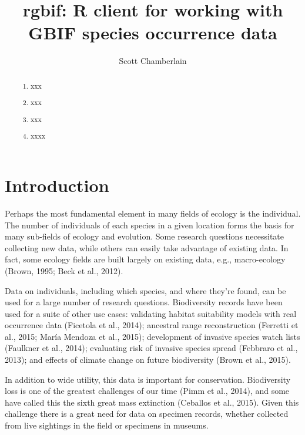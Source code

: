 \documentclass[author-year, review, 11pt]{components/elsarticle} %
\begin{document}
\begin{frontmatter}

  \title{rgbif: R client for working with GBIF species occurrence data}
    \author[cstar]{Scott Chamberlain}
      \address[cstar]{University of California, Berkeley, CA, USA}    
  
  \begin{abstract}
  \begin{enumerate}
  \def\labelenumi{\arabic{enumi}.}
  \item
    xxx
  \item
    xxx
  \item
    xxx
  \item
    xxxx
  \end{enumerate}
  \end{abstract}
  
 \end{frontmatter}


\section{Introduction}\label{introduction}

Perhaps the most fundamental element in many fields of ecology is the
individual. The number of individuals of each species in a given
location forms the basis for many sub-fields of ecology and evolution.
Some research questions necessitate collecting new data, while others
can easily take advantage of existing data. In fact, some ecology fields
are built largely on existing data, e.g., macro-ecology (Brown, 1995;
Beck et al., 2012).

Data on individuals, including which species, and where they're found,
can be used for a large number of research questions. Biodiversity
records have been used for a suite of other use cases: validating
habitat suitability models with real occurrence data (Ficetola et al.,
2014); ancestral range reconstruction (Ferretti et al., 2015; Mar{í}a
Mendoza et al., 2015); development of invasive species watch lists
(Faulkner et al., 2014); evaluating risk of invasive species spread
(Febbraro et al., 2013); and effects of climate change on future
biodiversity (Brown et al., 2015).

In addition to wide utility, this data is important for conservation.
Biodiversity loss is one of the greatest challenges of our time (Pimm et
al., 2014), and some have called this the sixth great mass extinction
(Ceballos et al., 2015). Given this challenge there is a great need for
data on specimen records, whether collected from live sightings in the
field or specimens in museums.
\end{document}
